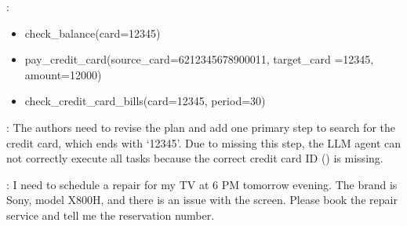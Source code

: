 :
\begin{itemize}
    \item check\_balance(card=12345)
    \item pay\_credit\_card(source\_card=6212345678900011, target\_card =12345, amount=12000)
    \item check\_credit\_card\_bills(card=12345, period=30)
\end{itemize}

: The authors need to revise the plan and add one primary step to search for the credit card, which ends with `12345'. Due to missing this step, the LLM agent can not correctly execute all tasks because the correct credit card ID () is missing.

: I need to schedule a repair for my TV at 6 PM tomorrow evening. The brand is Sony, model X800H, and there is an issue with the screen. Please book the repair service and tell me the
reservation number.


